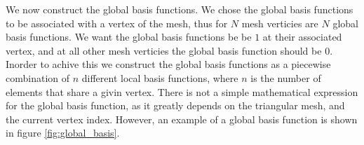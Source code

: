 \documentclass[../fem.tex]{subfiles}
\begin{document}
We now construct the global basis functions. We chose the global basis
functions to be associated with a vertex of the mesh, thus for $N$ mesh
verticies are $N$ global basis functions. We want the global basis functions be
be $1$ at their associated vertex, and at all other mesh verticies the global
basis function should be $0$. Inorder to achive this we construct the global
basis functions as a piecewise combination of $n$ different local basis
functions, where $n$ is the number of elements that share a givin vertex. There
is not a simple mathematical expression for the global basis function, as it
greatly depends on the triangular mesh, and the current vertex index. However,
an example of a global basis function is shown in figure
\ref{fig:global_basis}.

\begin{Figure}
   \begin{center}
   \end{center}
   \label{fig:global_basis}
\end{Figure}
\end{document}
